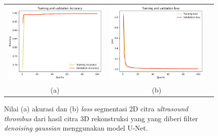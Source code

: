 \begin{enumerate}
	
	\begin{figure}[htbp]
		\centering
		\begin{tabular}{ccc}
			\includegraphics[scale=0.5]{bab4/Rekap Training/UNet/Gaussian/1/acc_99,63463544845581.png} &
			\includegraphics[scale=0.5]{bab4/Rekap Training/UNet/Gaussian/1/loss_0,0083.png} & \\
			(a) & (b)    %
		\end{tabular}
		\caption{Nilai (a) akurasi dan (b) \textit{loss} segmentasi 2D citra \textit{ultrasound} \textit{thrombus} dari hasil citra 3D rekonstruksi yang yang diberi filter \textit{denoising} \textit{gaussian} menggunakan model U-Net.}
		\label{fig:performance-gaussian-unet-rekonstruksi}
	\end{figure}
	

\end{enumerate}
